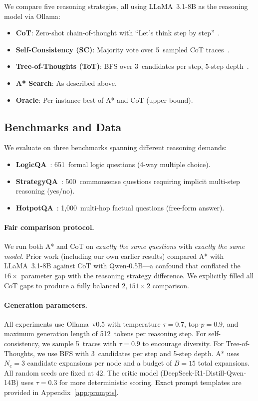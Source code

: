 \documentclass[11pt]{article}
\begin{document}
We compare five reasoning strategies, all using LLaMA~3.1-8B as the reasoning model via Ollama:

\begin{itemize}[leftmargin=1.5em,itemsep=2pt]
\item \textbf{CoT}: Zero-shot chain-of-thought with ``Let's think step by step''~\citep{wei2022chain}.
\item \textbf{Self-Consistency (SC)}: Majority vote over 5~sampled CoT traces~\citep{wang2023self}.
\item \textbf{Tree-of-Thoughts (ToT)}: BFS over 3~candidates per step, 5-step depth~\citep{yao2024tree}.
\item \textbf{A* Search}: As described above.
\item \textbf{Oracle}: Per-instance best of A* and CoT (upper bound).
\end{itemize}

\subsection{Benchmarks and Data}
\label{sec:data}

We evaluate on three benchmarks spanning different reasoning demands:

\begin{itemize}[leftmargin=1.5em,itemsep=2pt]
\item \textbf{LogicQA}~\citep{liu2020logiqa}: 651~formal logic questions (4-way multiple choice).
\item \textbf{StrategyQA}~\citep{geva2021did}: 500~commonsense questions requiring implicit multi-step reasoning (yes/no).
\item \textbf{HotpotQA}~\citep{yang2018hotpotqa}: 1,000~multi-hop factual questions (free-form answer).
\end{itemize}

\paragraph{Fair comparison protocol.}
We run both A* and CoT on \emph{exactly the same questions} with \emph{exactly the same model}. Prior work (including our own earlier results) compared A* with LLaMA~3.1-8B against CoT with Qwen-0.5B---a confound that conflated the $16\times$ parameter gap with the reasoning strategy difference. We explicitly filled all CoT gaps to produce a fully balanced $2{,}151 \times 2$ comparison.

\paragraph{Generation parameters.}
All experiments use Ollama~v0.5 with temperature $\tau = 0.7$, top-$p = 0.9$, and maximum generation length of 512~tokens per reasoning step. For self-consistency, we sample 5~traces with $\tau = 0.9$ to encourage diversity. For Tree-of-Thoughts, we use BFS with 3~candidates per step and 5-step depth. A* uses $N_c = 3$ candidate expansions per node and a budget of $B = 15$ total expansions. All random seeds are fixed at 42. The critic model (DeepSeek-R1-Distill-Qwen-14B) uses $\tau = 0.3$ for more deterministic scoring. Exact prompt templates are provided in Appendix~\ref{app:prompts}.
\end{document}
